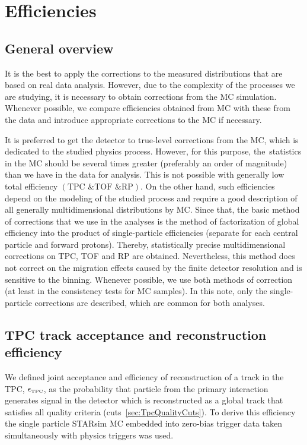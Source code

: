 

\chapter{Efficiencies}\label{chap:efficiencies}
\section{General overview}\label{sec:effGeneralOverview}
It is the best to apply the corrections to the measured distributions  that are based on real data analysis. However, due to the complexity of the processes we are studying, it is necessary to obtain corrections from the MC simulation. Whenever possible, we compare efficiencies obtained from MC with these from the data and introduce appropriate corrections to the MC if necessary.

It is preferred to get the detector to true-level corrections from the MC, which is dedicated to the studied physics process. However, for this purpose, the~statistics in the MC should be several times greater (preferably an order of magnitude) than we have in the data for analysis. This is not possible with generally low total efficiency $\left(\textrm{TPC \& TOF \& RP}\right)$. On the other hand, such efficiencies depend on the modeling of the studied process and require a good description of all generally multidimensional distributions  by MC. Since that, the basic method of corrections that we use in the analyses is the method of factorization of global efficiency into the product of single-particle efficiencies (separate for each central particle and forward protons). Thereby,  statistically precise multidimensional corrections on TPC, TOF and RP are obtained. Nevertheless, this method does not correct on the migration effects caused by the finite detector resolution and is sensitive to the binning. Whenever possible, we use both methods of correction (at least in the consistency tests for MC samples). In this note, only the single-particle corrections are described, which are common for both analyses.

\section{TPC track acceptance and reconstruction efficiency}\label{sec:tpcAccAndEff}
We defined joint acceptance and efficiency of reconstruction of a track in the TPC, $\epsilon_{\textrm{\tiny TPC}}$, as the probability that particle from the primary interaction generates signal in the detector which is reconstructed as a global track that satisfies all quality criteria (cuts~\ref{sec:TpcQualityCuts}).
To derive this efficiency the single particle STARsim MC embedded into zero-bias trigger data taken simultaneously with physics triggers 
 was used.

